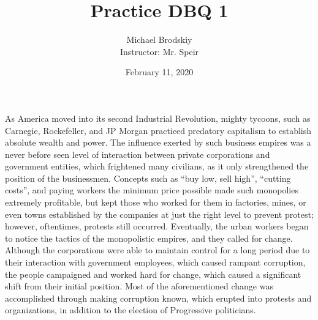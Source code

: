 \documentclass[12pt]{article}
\title{Practice DBQ 1}
\date{February 11, 2020}
\author{Michael Brodskiy\\ \small Instructor: Mr. Speir}
\begin{document}
\maketitle

\paragraph{} As America moved into its second Industrial Revolution, mighty tycoons, such as Carnegie, Rockefeller, and JP Morgan practiced predatory capitalism to establish absolute wealth and power. The influence exerted by such business empires was a never before seen level of interaction between private corporations and government entities, which frightened many civilians, as it only strengthened the position of the businessmen. Concepts such as ``buy low, sell high'', ``cutting costs'', and paying workers the minimum price possible made such monopolies extremely profitable, but kept those who worked for them in factories, mines, or even towns established by the companies at just the right level to prevent protest; however, oftentimes, protests still occurred. Eventually, the urban workers began to notice the tactics of the monopolistic empires, and they called for change. Although the corporations were able to maintain control for a long period due to their interaction with government employees, which caused rampant corruption, the people campaigned and worked hard for change, which caused a significant shift from their initial position. Most of the aforementioned change was accomplished through making corruption known, which erupted into protests and organizations, in addition to the election of Progressive politicians.
\end{document}
